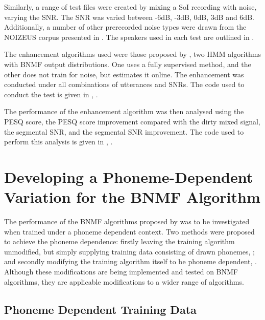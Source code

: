 Similarly, a range of test files were created by mixing a \ac{SoI}
recording with noise, varying the \ac{SNR}. The \ac{SNR} was varied
between -6dB, -3dB, 0dB, 3dB and 6dB. Additionally, a number of other
prerecorded noise types were drawn from the NOIZEUS corpus presented
in \citep{Hu2006}. The speakers used in each test are outlined in
.

The enhancement algorithms used were those proposed by \citet{mohammadiha2013supervised},
two \ac{HMM} algorithms with \ac{BNMF} output distributions. One
uses a fully supervised method, and the other does not train for noise,
but estimates it online. The enhancement was conducted under all combinations
of utterances and \acp{SNR}. The code used to conduct the test is
given in , \textit{}.

The performance of the enhancement algorithm was then analysed using
the \ac{PESQ} score, the \ac{PESQ} score improvement compared with
the dirty mixed signal, the segmental \ac{SNR}, and the segmental
\ac{SNR} improvement. The code used to perform this analysis is given
in , \textit{}.


\section{\label{sec:Develop-Phoneme-Dependent}Developing a Phoneme-Dependent
Variation for the \acl{BNMF} Algorithm}

The performance of the \ac{BNMF} algorithms proposed by \citet{mohammadiha2013supervised}
was to be investigated when trained under a phoneme dependent context.
Two methods were proposed to achieve the phoneme dependence: firstly
leaving the training algorithm unmodified, but simply supplying training
data consisting of drawn phonemes, \textbf{};
and secondly modifying the training algorithm itself to be phoneme
dependent, \textbf{}. Although these
modifications are being implemented and tested on \ac{BNMF} algorithms,
they are applicable modifications to a wider range of algorithms.



\subsection{\label{sub:Phoneme-Training}Phoneme Dependent Training Data}

